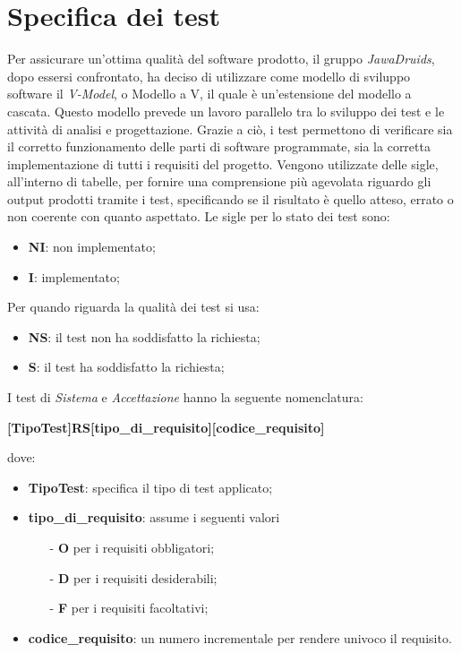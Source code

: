 \chapter{Specifica dei test} \label{SpecificaDeiTest}
Per assicurare un’ottima qualità del software prodotto, il gruppo \textit{JawaDruids}, dopo essersi confrontato, ha deciso di utilizzare come modello di sviluppo software il \textit{V-Model}, o Modello a V, il quale è un’estensione del modello a cascata.
Questo modello prevede un lavoro parallelo tra lo sviluppo dei test e le attività di analisi e progettazione.
Grazie a ciò, i test permettono di verificare sia il corretto funzionamento delle parti di software programmate, sia la corretta implementazione di tutti i requisiti del progetto.
Vengono utilizzate delle sigle, all’interno di tabelle, per fornire una comprensione più agevolata riguardo gli output prodotti tramite i test, specificando se il risultato è quello atteso, errato o non coerente con quanto aspettato.
Le sigle per lo stato dei test sono:
\begin{itemize}
	\item \textbf{NI}: non implementato;
	\item \textbf{I}: implementato;
\end{itemize}
Per quando riguarda la qualità dei test si usa:
\begin{itemize}
	\item \textbf{NS}: il test non ha soddisfatto la richiesta;
	\item \textbf{S}: il test ha soddisfatto la richiesta; 
\end{itemize}

I test di \textit{Sistema} e \textit{Accettazione} hanno la seguente nomenclatura:
\begin{center}
	\textbf{[TipoTest]RS[tipo\_di\_requisito][codice\_requisito]}
\end{center}
dove:
\begin{itemize}
	\item \textbf{TipoTest}: specifica il tipo di test applicato;
	\item \textbf{tipo\_di\_requisito}: assume i seguenti valori
		\begin{itemize}
			\item[-] \textbf{O} per i requisiti obbligatori;
			\item[-] \textbf{D} per i requisiti desiderabili;
			\item[-] \textbf{F} per i requisiti facoltativi;
		\end{itemize}
	\item \textbf{codice\_requisito}: un numero incrementale per rendere univoco il requisito.
\end{itemize}

